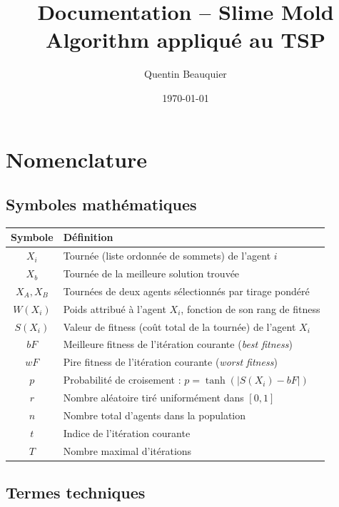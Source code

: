\documentclass[12pt,a4paper]{report}
\title{Documentation -- Slime Mold Algorithm appliqué au TSP}
\author{Quentin Beauquier}
\date{\today}
\begin{document}
\maketitle
\tableofcontents
\newpage

\chapter*{Nomenclature}

\section*{Symboles mathématiques}

\begin{table}[h]
	\centering
	\begin{tabular}{@{}cl@{}}
		\toprule
		\textbf{Symbole} & \textbf{Définition} \\
		\midrule
		$X_i$     & Tournée (liste ordonnée de sommets) de l'agent $i$ \\
		$X_b$     & Tournée de la meilleure solution trouvée \\
		$X_A, X_B$ & Tournées de deux agents sélectionnés par tirage pondéré \\
		$W(X_i)$  & Poids attribué à l'agent $X_i$, fonction de son rang de fitness \\
		$S(X_i)$  & Valeur de fitness (coût total de la tournée) de l'agent $X_i$ \\
		$bF$      & Meilleure fitness de l'itération courante (\textit{best fitness}) \\
		$wF$      & Pire fitness de l'itération courante (\textit{worst fitness}) \\
		$p$       & Probabilité de croisement : $p = \tanh(|S(X_i) - bF|)$ \\
		$r$       & Nombre aléatoire tiré uniformément dans $[0, 1]$ \\
		$n$       & Nombre total d'agents dans la population \\
		$t$       & Indice de l'itération courante \\
		$T$       & Nombre maximal d'itérations \\
		\bottomrule
	\end{tabular}
\end{table}

\section*{Termes techniques}
\end{document}
